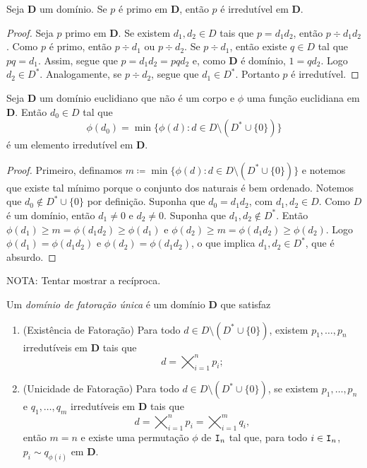 \begin{prop}
	Seja $\bm D$ um domínio. Se $p$ é primo em $\bm D$, então $p$ é irredutível em $\bm D$.
\end{prop}
\begin{proof}
	Seja $p$ primo em $\bm D$. Se existem $d_1,d_2 \in D$ tais que $p=d_1d_2$, então $p \div d_1d_2$. Como $p$ é primo, então $p \div d_1$ ou $p \div d_2$. Se $p \div d_1$, então existe $q \in D$ tal que $pq=d_1$. Assim, segue que $p=d_1d_2=pqd_2$ e, como $\bm D$ é domínio, $1=qd_2$. Logo $d_2 \in D^*$. Analogamente, se $p \div d_2$, segue que $d_1 \in D^*$. Portanto $p$ é irredutível.
\end{proof}

\begin{prop}
	Seja $\bm D$ um domínio euclidiano que não é um corpo e $\phi$ uma função euclidiana em $\bm D$. Então $d_0 \in D$ tal que
	\begin{equation*}
	\phi(d_0) = \min\{\phi(d) : d \in D \setminus (D^* \cup \{0\}) \}
	\end{equation*}
é um elemento irredutível em $\bm D$.
\end{prop}
\begin{proof}
	Primeiro, definamos $m \coloneqq \min\{\phi(d) : d \in D \setminus (D^* \cup \{0\}) \}$ e notemos que existe tal mínimo porque o conjunto dos naturais é bem ordenado. Notemos que $d_0 \notin D^* \cup \{0\}$ por definição. Suponha que $d_0 = d_1d_2$, com $d_1,d_2 \in D$. Como $D$ é um domínio, então $d_1 \neq 0$ e $d_2 \neq 0$. Suponha que $d_1,d_2 \notin D^*$. Então $\phi(d_1) \geq m = \phi(d_1d_2) \geq \phi(d_1)$ e $\phi(d_2) \geq m = \phi(d_1d_2) \geq \phi(d_2)$. Logo $\phi(d_1)=\phi(d_1d_2)$ e $\phi(d_2)=\phi(d_1d_2)$, o que implica $d_1,d_2 \in D^*$, que é absurdo.
\end{proof}

NOTA: Tentar mostrar a recíproca.

\begin{defi}
	Um \emph{domínio de fatoração única} é um domínio $\bm D$ que satisfaz
	\begin{enumerate}
	\item (Existência de Fatoração) Para todo $d \in D \setminus (D^* \cup \{0\})$, existem $p_1, \ldots, p_n$ irredutíveis em $\bm D$ tais que
	\begin{equation*}
	d = \bigtimes_{i=1}^n p_i;
	\end{equation*}
	\item (Unicidade de Fatoração) Para todo $d \in D \setminus (D^* \cup \{0\})$, se existem $p_1, \ldots, p_n$ e $q_1, \ldots, q_m$ irredutíveis em $\bm D$ tais que
	\begin{equation*}
	d = \bigtimes_{i=1}^n p_i = \bigtimes_{i=1}^m q_i,
	\end{equation*}
então $m=n$ e existe uma permutação $\phi$ de $\mathtt I_n$ tal que, para todo $i \in \mathtt I_n$, $p_i \sim q_{\phi(i)}$ em $\bm D$.
	\end{enumerate}
\end{defi}

